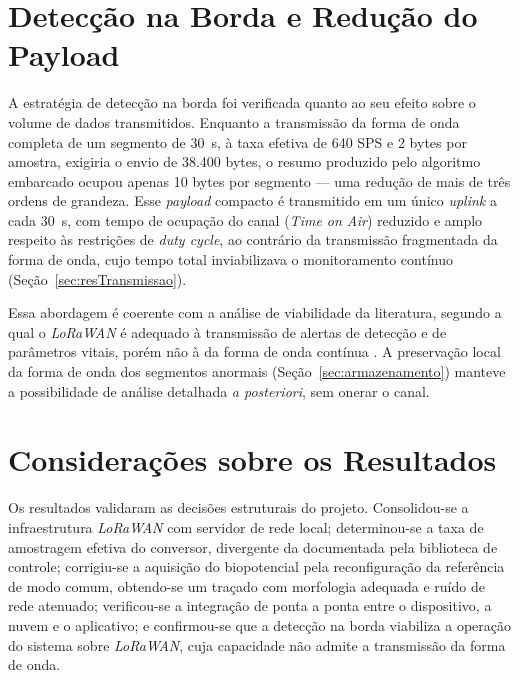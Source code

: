 \section{Detecção na Borda e Redução do Payload}
\label{sec:resDeteccao}

A estratégia de detecção na borda foi verificada quanto ao seu efeito sobre o volume de dados transmitidos. Enquanto a transmissão da forma de onda completa de um segmento de 30~s, à taxa efetiva de 640 SPS e 2 bytes por amostra, exigiria o envio de 38.400 bytes, o resumo produzido pelo algoritmo embarcado ocupou apenas 10 bytes por segmento — uma redução de mais de três ordens de grandeza. Esse \textit{payload} compacto é transmitido em um único \textit{uplink} a cada 30~s, com tempo de ocupação do canal (\textit{Time on Air}) reduzido e amplo respeito às restrições de \textit{duty cycle}, ao contrário da transmissão fragmentada da forma de onda, cujo tempo total inviabilizava o monitoramento contínuo (Seção~\ref{sec:resTransmissao}).

Essa abordagem é coerente com a análise de viabilidade da literatura, segundo a qual o \textit{LoRaWAN} é adequado à transmissão de alertas de detecção e de parâmetros vitais, porém não à da forma de onda contínua \citep{lorawanWaveform}. A preservação local da forma de onda dos segmentos anormais (Seção~\ref{sec:armazenamento}) manteve a possibilidade de análise detalhada \textit{a posteriori}, sem onerar o canal.
\section{Considerações sobre os Resultados}
\label{sec:resConsideracoes}

Os resultados validaram as decisões estruturais do projeto. Consolidou-se a infraestrutura
\textit{LoRaWAN} com servidor de rede local; determinou-se a taxa de amostragem efetiva do
conversor, divergente da documentada pela biblioteca de controle; corrigiu-se a aquisição do
biopotencial pela reconfiguração da referência de modo comum, obtendo-se um traçado com
morfologia adequada e ruído de rede atenuado; verificou-se a integração de ponta a ponta
entre o dispositivo, a nuvem e o aplicativo; e confirmou-se que a detecção na borda viabiliza
a operação do sistema sobre \textit{LoRaWAN}, cuja capacidade não admite a transmissão da
forma de onda.

